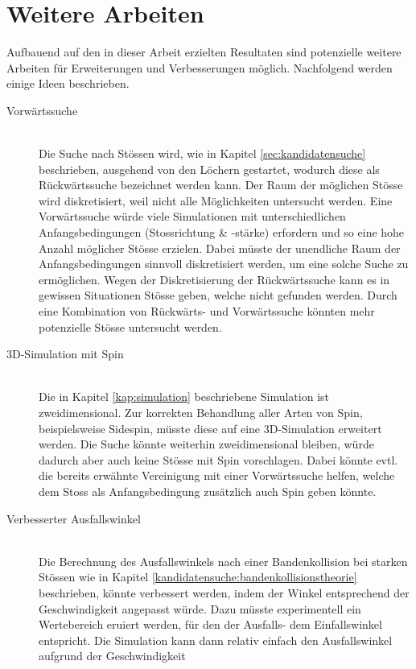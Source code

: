 \chapter{Weitere Arbeiten}\label{kap:weitere_arbeiten}
Aufbauend auf den in dieser Arbeit erzielten Resultaten sind potenzielle weitere Arbeiten für Erweiterungen und Verbesserungen
möglich.
Nachfolgend werden einige Ideen beschrieben.

\begin{description}
    \item[Vorwärtssuche]\mbox{} \\
    Die Suche nach Stössen wird, wie in Kapitel \ref{sec:kandidatensuche} beschrieben, ausgehend von den Löchern gestartet,
    wodurch diese als Rückwärtssuche bezeichnet werden kann.
    Der Raum der möglichen Stösse wird diskretisiert, weil nicht alle Möglichkeiten untersucht werden.
    Eine Vorwärtssuche würde viele Simulationen mit unterschiedlichen Anfangsbedingungen (Stossrichtung \& -stärke)
    erfordern und so eine hohe Anzahl möglicher Stösse erzielen.
    Dabei müsste der unendliche Raum der Anfangsbedingungen sinnvoll diskretisiert werden, um eine solche Suche zu ermöglichen.
    Wegen der Diskretisierung der Rückwärtssuche kann es in gewissen Situationen Stösse geben, welche nicht gefunden werden.
    Durch eine Kombination von Rückwärts- und Vorwärtssuche könnten mehr potenzielle Stösse untersucht werden.
    \item[3D-Simulation mit Spin]\mbox{} \\
    Die in Kapitel \ref{kap:simulation} beschriebene Simulation ist zweidimensional.
    Zur korrekten Behandlung aller Arten von Spin, beispielsweise Sidespin, müsste diese auf eine 3D-Simulation erweitert werden.
    Die Suche könnte weiterhin zweidimensional bleiben, würde dadurch aber auch keine Stösse mit Spin vorschlagen.
    Dabei könnte evtl. die bereits erwähnte Vereinigung mit einer Vorwärtssuche helfen, welche dem Stoss als
    Anfangsbedingung zusätzlich auch Spin geben könnte.
    \item[Verbesserter Ausfallswinkel]\mbox{} \\
    Die Berechnung des Ausfallswinkels nach einer Bandenkollision bei starken Stössen wie in
    Kapitel \ref{kandidatensuche:bandenkollisionstheorie} beschrieben, könnte verbessert werden, indem der Winkel entsprechend
    der Geschwindigkeit angepasst würde. Dazu müsste experimentell ein Wertebereich eruiert werden, für den der Ausfalls- dem
    Einfallswinkel entspricht. Die Simulation kann dann relativ einfach den Ausfallswinkel aufgrund der Geschwindigkeit

\end{description}
